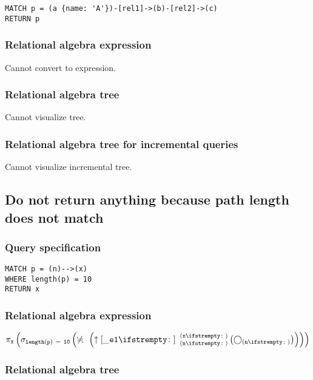 \begin{lstlisting}
MATCH p = (a {name: 'A'})-[rel1]->(b)-[rel2]->(c)
RETURN p
\end{lstlisting}

\subsubsection*{Relational algebra expression}

Cannot convert to expression.

\subsubsection*{Relational algebra tree}

Cannot visualize tree.

\subsubsection*{Relational algebra tree for incremental queries}

Cannot visualize incremental tree.

\subsection{Do not return anything because path length does not match}

\subsubsection*{Query specification}

\begin{lstlisting}
MATCH p = (n)-->(x)
WHERE length(p) = 10
RETURN x
\end{lstlisting}

\subsubsection*{Relational algebra expression}

$\projection{\var{x}} \left(\selection{\mathtt{length(p)~=~10}} \left(\alldifferent{} \left(\expandout{\_e1}{}{n}{x}{} \left(\getvertices{n}{}\right)\right)\right)\right)$

\subsubsection*{Relational algebra tree}

